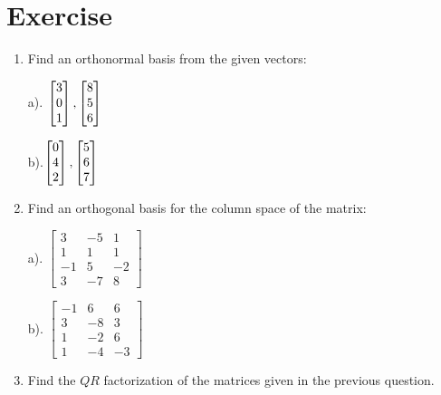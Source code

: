 \documentclass[aima104_lecturenotes_ku.tex]{subfiles}
\begin{document}
  \section{Exercise}
  \begin{enumerate}
  \item Find an orthonormal basis from the given vectors:
    \begin{multicols}{2}
    a). $\begin{bmatrix}
      3 \\ 0 \\ 1
    \end{bmatrix}, \vspace{5mm}
    \begin{bmatrix}
      8 \\ 5 \\ 6
    \end{bmatrix}
    $
    \columnbreak

b).$\begin{bmatrix}
      0 \\ 4 \\ 2
    \end{bmatrix}, \vspace{5mm}
    \begin{bmatrix}
      5 \\ 6 \\ 7
    \end{bmatrix}
    $
  \end{multicols}

\item Find an orthogonal basis for the column space of the matrix:
  \begin{multicols}{2}
    a).  $\begin{bmatrix}
        3 & -5 & 1 \\
        1 & 1 & 1 \\
        -1 & 5 &-2 \\
        3 & -7 & 8
    \end{bmatrix}$
    \columnbreak

    b).
    $\begin{bmatrix}
      -1 & 6 & 6 \\
      3 & -8 & 3 \\
      1 & -2 & 6 \\
      1 & -4 & -3
    \end{bmatrix}$
  \end{multicols}

\item Find the $QR$ factorization of the matrices given in the previous question.
\end{enumerate}
\end{document}
